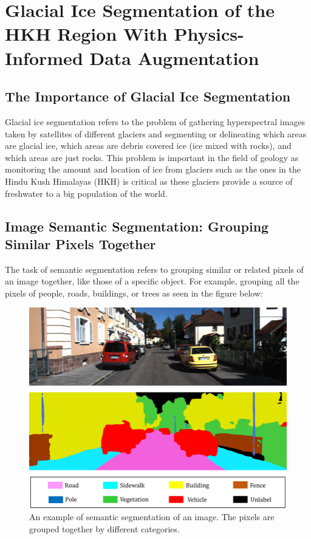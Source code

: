 \chapter{Glacial Ice Segmentation of the HKH Region With Physics-Informed Data Augmentation}
\section{The Importance of Glacial Ice Segmentation}
Glacial ice segmentation refers to the problem of gathering hyperspectral images taken by satellites of different glaciers and segmenting or delineating which areas are glacial ice, which areas are debris covered ice (ice mixed with rocks), and which areas are just rocks. This problem is important in the field of geology as monitoring the amount and location of ice from glaciers such as the ones in the Hindu Kush Himalayas (HKH) is critical as these glaciers provide a source of freshwater to a big population of the world.

\section{Image Semantic Segmentation: Grouping Similar Pixels Together}
The task of semantic segmentation refers to grouping similar or related pixels of an image together, like those of a specific object. For example, grouping all the pixels of people, roads, buildings, or trees as seen in the figure below:

\begin{figure}[H] \centering
    \includegraphics[width=\linewidth]{figures/semantic_segmentation.png}
    \caption{An example of semantic segmentation of an image. The pixels are grouped together by different categories.}
    \label{fig:example_semantic_segmentation}
\end{figure}

